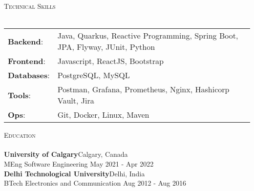 \documentclass[a4paper]{article}
\newcommand{\lineunder} {
    \vspace*{-8pt} \\
    \hspace*{-18pt} \hrulefill \\
}
\newcommand{\header} [1] {
    {\hspace*{-18pt}\vspace*{6pt} \textsc{#1}}
    \vspace*{-6pt} \lineunder
}
\begin{document}
\header{Technical Skills}
\vspace{1mm}
\begin{tabular}{ l l }
    \textbf{Backend}:   & Java, Quarkus, Reactive Programming, Spring Boot, JPA, Flyway, JUnit, Python  \\
    \textbf{Frontend}:  & Javascript, ReactJS, Bootstrap                                                \\
    \textbf{Databases}: & PostgreSQL, MySQL                                                             \\
    \textbf{Tools}:     & Postman, Grafana, Prometheus, Nginx, Hashicorp Vault, Jira                    \\
    \textbf{Ops}:       & Git, Docker, Linux, Maven                                                     \\
\end{tabular}
\vspace{2mm}


\header{Education}
\vspace{1mm}
\textbf{University of Calgary}\hfill Calgary, Canada\\
MEng Software Engineering \hfill May 2021 - Apr 2022\\
\vspace{2mm}
\textbf{Delhi Technological University}\hfill Delhi, India\\
BTech Electronics and Communication \hfill Aug 2012 - Aug 2016\\
\vspace{2mm}


\
\end{document}
